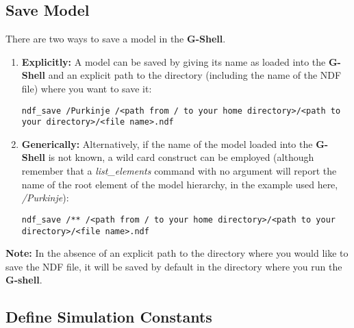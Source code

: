 \documentclass[12pt]{article}
\begin{document}
\subsection*{Save Model}

There are two ways to save a model in the {\bf G-Shell}.

\begin{enumerate}
   \item{\bf Explicitly:} A model can be saved by giving its name as loaded into the {\bf G-Shell} and an explicit path to the directory (including the name of the NDF file) where you want to save it:
   \begin{verbatim}
ndf_save /Purkinje /<path from / to your home directory>/<path to your directory>/<file name>.ndf
   \end{verbatim}
   \item{\bf Generically:} Alternatively, if the name of the model loaded into the {\bf G-Shell} is not known, a wild card construct can be employed (although remember that a {\it list\_elements} command with no argument will report the name of the root element of the model hierarchy, in the example used here, {\it /Purkinje}):
   \begin{verbatim}
ndf_save /** /<path from / to your home directory>/<path to your directory>/<file name>.ndf
   \end{verbatim}   
\end{enumerate}
{\bf Note:} In the absence of an explicit path to the directory where you would like to save the NDF file, it will be saved by default in the directory where you run the {\bf G-shell}.

\subsection*{Define Simulation Constants}
\end{document}

